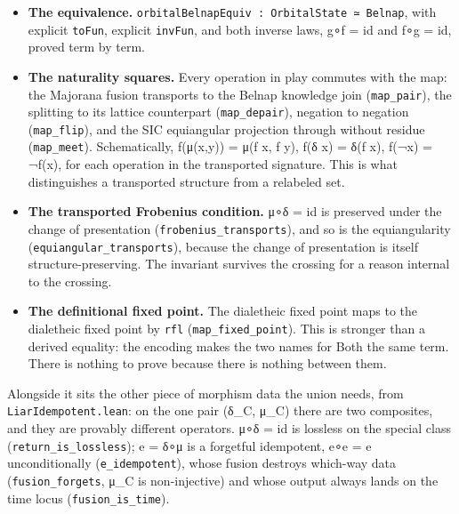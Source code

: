 \documentclass[12pt,a4paper]{article}
\begin{document}
\begin{itemize}
\tightlist
\item
  \textbf{The equivalence.}
  \texttt{orbitalBelnapEquiv\ :\ OrbitalState\ ≃\ Belnap}, with explicit
  \texttt{toFun}, explicit \texttt{invFun}, and both inverse laws, g∘f =
  id and f∘g = id, proved term by term.
\item
  \textbf{The naturality squares.} Every operation in play commutes with
  the map: the Majorana fusion transports to the Belnap knowledge join
  (\texttt{map\_pair}), the splitting to its lattice counterpart
  (\texttt{map\_depair}), negation to negation (\texttt{map\_flip}), and
  the SIC equiangular projection through without residue
  (\texttt{map\_meet}). Schematically, f(μ(x,y)) = μ(f x, f y), f(δ x) =
  δ(f x), f(¬x) = ¬f(x), for each operation in the transported
  signature. This is what distinguishes a transported structure from a
  relabeled set.
\item
  \textbf{The transported Frobenius condition.} μ∘δ = id is preserved
  under the change of presentation (\texttt{frobenius\_transports}), and
  so is the equiangularity (\texttt{equiangular\_transports}), because
  the change of presentation is itself structure-preserving. The
  invariant survives the crossing for a reason internal to the crossing.
\item
  \textbf{The definitional fixed point.} The dialetheic fixed point maps
  to the dialetheic fixed point by \texttt{rfl}
  (\texttt{map\_fixed\_point}). This is stronger than a derived
  equality: the encoding makes the two names for Both the same term.
  There is nothing to prove because there is nothing between them.
\end{itemize}

Alongside it sits the other piece of morphism data the union needs, from
\texttt{LiarIdempotent.lean}: on the one pair (δ\_C, μ\_C) there are two
composites, and they are provably different operators. μ∘δ = id is
lossless on the special class (\texttt{return\_is\_lossless}); e = δ∘μ
is a forgetful idempotent, e∘e = e unconditionally
(\texttt{e\_idempotent}), whose fusion destroys which-way data
(\texttt{fusion\_forgets}, μ\_C is non-injective) and whose output
always lands on the time locus (\texttt{fusion\_is\_time}).
\end{document}
